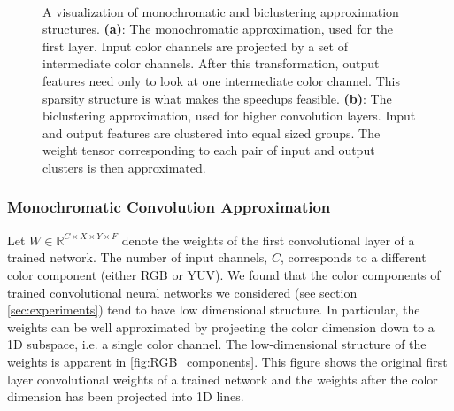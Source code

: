 \begin{figure}[ht]
\centering
\mbox{
\hspace{5mm}
\hspace{5mm}
}
\vspace{-3mm}
\caption{ A visualization of monochromatic and biclustering approximation structures. {\bf (a)}: The monochromatic approximation, used for the first layer. Input color channels are projected by a set of intermediate color channels. After this transformation, output features need only to look at one intermediate color channel. This sparsity structure is what makes the speedups feasible. {\bf (b)}: The biclustering approximation, used for higher convolution layers. Input and output features are clustered into equal sized groups. The weight tensor corresponding to each pair of input and output clusters is then approximated.}
\end{figure}

\subsubsection{Monochromatic Convolution Approximation}
Let $W \in \mathbb{R}^{C \times X \times Y \times F}$ denote the
weights of the first convolutional layer of a trained network.  The
number of input channels, $C$, corresponds to a different color
component (either RGB or YUV).  We found that the color components of trained convolutional neural networks we considered (see
section \ref{sec:experiments}) tend to have low dimensional structure. In
particular, the weights can be well approximated by projecting the
color dimension down to a 1D subspace, i.e. a single color
channel. The low-dimensional structure of the weights is apparent in
\ref{fig:RGB_components}. This figure shows the original first layer convolutional weights
of a trained network and the weights after the color dimension has
been projected into 1D lines.

